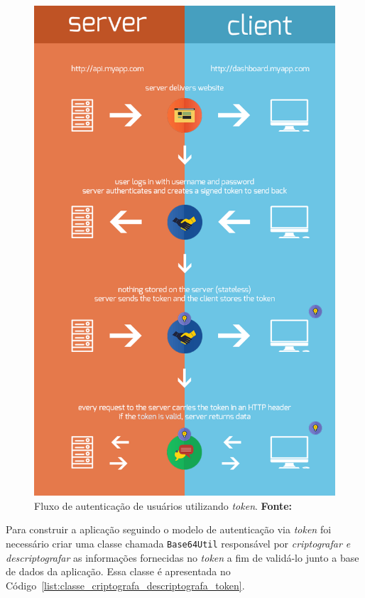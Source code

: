 \newpage
\begin{figure}[h!]
	\centerline{\includegraphics[scale=0.5]{./imagens/tokens-new.png}}
	\caption[Fluxo de autenticação de usuários utilizando \textit{token}]
	{Fluxo de autenticação de usuários utilizando \textit{token}. \textbf{Fonte:} \cite{authentication_via_token_chris_sevilleja}}
	\label{fig:autenticacao_via_token}
\end{figure}

Para construir a aplicação seguindo o modelo de autenticação via \textit{token} foi necessário criar uma classe chamada \texttt{Base64Util} responsável por \textit{criptografar e descriptografar} as informações fornecidas no \textit{token} a fim de validá-lo junto a base de dados da aplicação. Essa classe é apresentada no Código~\ref{list:classe_criptografa_descriptografa_token}.

